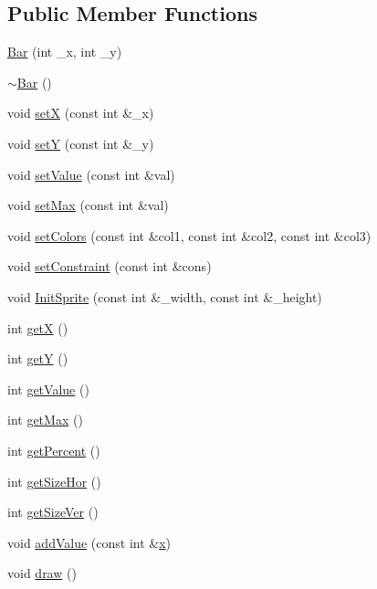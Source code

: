 \subsection*{Public Member Functions}
\begin{DoxyCompactItemize}
\item 
\hyperlink{class_bar_aa9f14363103e806a03386e4ca1c6059c}{Bar} (int \+\_\+x, int \+\_\+y)
\item 
\hyperlink{class_bar_a9c7ebea0c189423591741ac438985316}{$\sim$\+Bar} ()
\item 
void \hyperlink{class_bar_aa2c599d99b800583912ae4eceaceab25}{setX} (const int \&\+\_\+x)
\item 
void \hyperlink{class_bar_a0a7c832508710943849a0c1bbb583df2}{setY} (const int \&\+\_\+y)
\item 
void \hyperlink{class_bar_a9569adedec553a3f0e59f25e7d3b8706}{set\+Value} (const int \&val)
\item 
void \hyperlink{class_bar_a2e0ce34dc27f1b190d9978c90589ea58}{set\+Max} (const int \&val)
\item 
void \hyperlink{class_bar_a408623411aa44075f71a9fb1aba087e3}{set\+Colors} (const int \&col1, const int \&col2, const int \&col3)
\item 
void \hyperlink{class_bar_a81776d2466602e98785ad11c460d14ff}{set\+Constraint} (const int \&cons)
\item 
void \hyperlink{class_bar_ad45cba6081a961ba5c52514548cee1bc}{Init\+Sprite} (const int \&\+\_\+width, const int \&\+\_\+height)
\item 
int \hyperlink{class_bar_a77082682857b8211de1b219ac62ef747}{getX} ()
\item 
int \hyperlink{class_bar_af2b622c5aca08ec137927662a77bfef5}{getY} ()
\item 
int \hyperlink{class_bar_a60e69829339826a504d19d019c0daf15}{get\+Value} ()
\item 
int \hyperlink{class_bar_a47d34aaf6d550f55420276ebf2f8a19c}{get\+Max} ()
\item 
int \hyperlink{class_bar_a3d82834008b72a493a35e2f0cfa20fb6}{get\+Percent} ()
\item 
int \hyperlink{class_bar_aeaf702aaa26ed222e1b5014c46ca3648}{get\+Size\+Hor} ()
\item 
int \hyperlink{class_bar_ad5d433eb126016025fff4756c7df1402}{get\+Size\+Ver} ()
\item 
void \hyperlink{class_bar_a24a08c0c5d9c69b8c66abd3a93d0f709}{add\+Value} (const int \&\hyperlink{class_bar_afec956dd7e6968d868526e11719ecc84}{x})
\item 
void \hyperlink{class_bar_aeb2be7aa59cc5475899800d2ce7bfbf7}{draw} ()
\end{DoxyCompactItemize}
